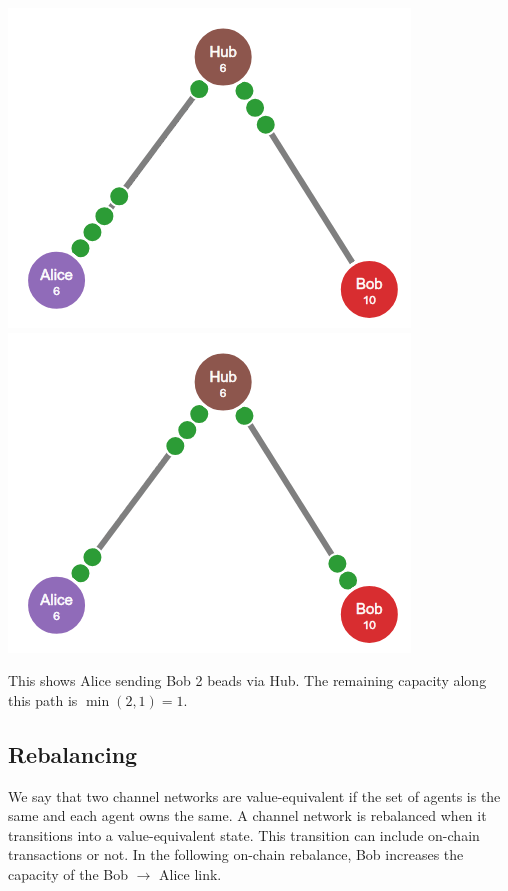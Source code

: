 \documentclass{article}
\begin{document}
\begin{center}
\includegraphics[scale=0.4]{beads.png}
\includegraphics[scale=0.4]{beads2.png}
\end{center}

This shows Alice sending Bob 2 beads via Hub. The remaining capacity along this path is $\min(2,1) = 1$.

\subsection*{Rebalancing}

We say that two channel networks are value-equivalent if the set of agents is the same and each agent owns the same. A channel network is rebalanced when it transitions into a value-equivalent state. This transition can include on-chain transactions or not. In the following on-chain rebalance, Bob increases the capacity of the Bob $\to$ Alice link.
\end{document}
